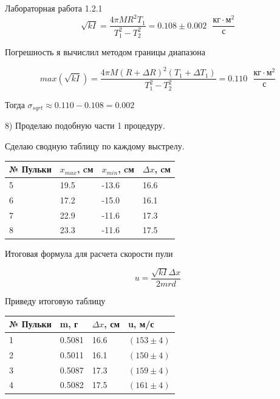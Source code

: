 \documentclass{astroedu-lab}
\begin{document}
\begin{problem}{\large Лабораторная работа 1.2.1}
\begin{equation}
	\sqrt{k I} = \frac{4 \pi M R^2 T_1}{T_1^2 - T_2^2} = 0.108 \pm 0.002 \text{ }\frac{\text{кг} \cdot \text{м}^2}{\text{с}}
\end{equation}

Погрешность я вычислил методом границы диапазона

\begin{equation}
	max(\sqrt{k I}) = \frac{4 \pi M (R + \Delta R)^2 (T_1 + \Delta T_1)}{T_1^2 - T_2^2} = 0.110 \text{ }\frac{\text{кг} \cdot \text{м}^2}{\text{с}}
\end{equation}

Тогда $\sigma_{sqrt} \approx 0.110 - 0.108 = 0.002$

8) Проделаю подобную части 1 процедуру.

Сделаю сводную таблицу по каждому выстрелу.

\begin{center}
\begin{tabular}[t]{|l|l|l|l|}
\hline
№ Пульки & $x_{max}$, cм & $x_{min}$, cм & $\Delta x$, cм \\
\hline
5 & 19.5 & -13.6 & 16.6 \\
6 & 17.2 & -15.0 & 16.1 \\
7 & 22.9 & -11.6 & 17.3 \\
8 & 23.3 & -11.6 & 17.5 \\
\hline
\end{tabular}
\end{center}

Итоговая формула для расчета скорости пули

\begin{equation}
	u = \frac{\sqrt{k I} \Delta x}{2 m r d}
\end{equation}

Приведу итоговую таблицу

\begin{center}
\begin{tabular}[t]{|l|l|l|l|}
\hline
№ Пульки & m, г & $\Delta x$, см & u, м/с \\
\hline
1 & 0.5081 & 16.6 & $(153 \pm 4)$ \\
2 & 0.5011 & 16.1 & $(150 \pm 4)$ \\
3 & 0.5087 & 17.3 & $(159 \pm 4)$ \\
4 & 0.5082 & 17.5 & $(161 \pm 4)$ \\
\hline
\end{tabular}
\end{center}


\end{problem}
\end{document}
